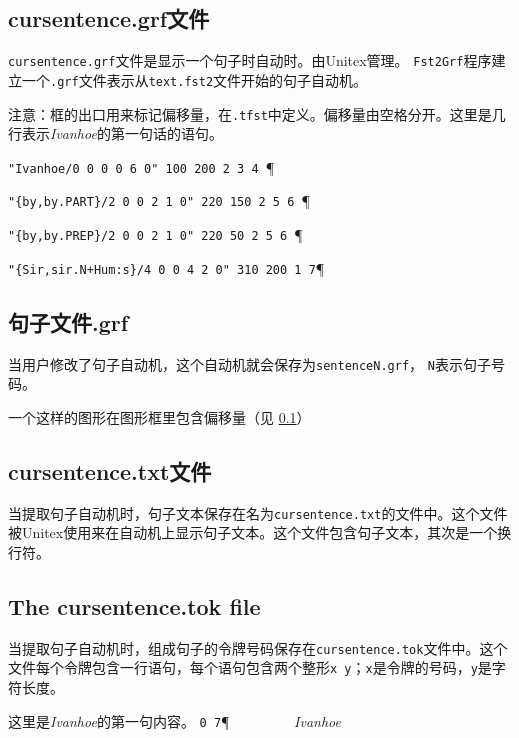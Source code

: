 \subsection{ cursentence.grf文件}
\label{section-cursentence_grf}
\verb+cursentence.grf+文件是显示一个句子时自动时。由Unitex管理。 \verb+Fst2Grf+程序建立一个\verb+.grf+文件表示从\verb+text.fst2+文件开始的句子自动机。



\bigskip
\noindent
注意：框的出口用来标记偏移量，在\verb+.tfst+中定义。偏移量由空格分开。这里是几行表示\textit{Ivanhoe}的第一句话的语句。



\bigskip
\noindent \verb$"Ivanhoe/0 0 0 0 6 0" 100 200 2 3 4 $\P
 
\noindent \verb$"{by,by.PART}/2 0 0 2 1 0" 220 150 2 5 6 $\P

\noindent \verb$"{by,by.PREP}/2 0 0 2 1 0" 220 50 2 5 6 $\P

\noindent \verb$"{Sir,sir.N+Hum:s}/4 0 0 4 2 0" 310 200 1 7$\P 




\subsection{句子文件.grf}
当用户修改了句子自动机，这个自动机就会保存为\verb+sentenceN.grf+， \verb+N+表示句子号码。


一个这样的图形在图形框里包含偏移量（见 \ref{section-cursentence_grf}）

\subsection{ cursentence.txt文件}
当提取句子自动机时，句子文本保存在名为\verb+cursentence.txt+的文件中。这个文件被Unitex使用来在自动机上显示句子文本。这个文件包含句子文本，其次是一个换行符。


\subsection{The cursentence.tok file}
当提取句子自动机时，组成句子的令牌号码保存在\verb+cursentence.tok+文件中。这个文件每个令牌包含一行语句，每个语句包含两个整形\verb$x y$；\verb$x$是令牌的号码，\verb$y$是字符长度。

\bigskip
\noindent 这里是\textit{Ivanhoe}的第一句内容。
\bigskip
\noindent \verb$0 7$\P \verb$         $\textit{Ivanhoe}

